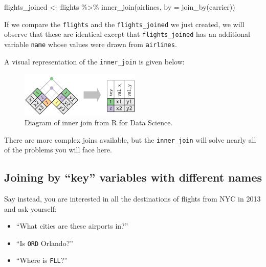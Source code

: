 \documentclass[
  letterpaper,
  DIV=11,
  numbers=noendperiod]{scrartcl}
\newenvironment{Shaded}{\begin{snugshade}}{\end{snugshade}}
\newcommand{\AttributeTok}[1]{\textcolor[rgb]{0.40,0.45,0.13}{#1}}
\newcommand{\FunctionTok}[1]{\textcolor[rgb]{0.28,0.35,0.67}{#1}}
\newcommand{\NormalTok}[1]{\textcolor[rgb]{0.00,0.23,0.31}{#1}}
\newcommand{\OtherTok}[1]{\textcolor[rgb]{0.00,0.23,0.31}{#1}}
\newcommand{\SpecialCharTok}[1]{\textcolor[rgb]{0.37,0.37,0.37}{#1}}
\providecommand{\tightlist}{%
  \setlength{\itemsep}{0pt}\setlength{\parskip}{0pt}}\usepackage{longtable,booktabs,array}
\begin{document}
\begin{Shaded}
\begin{Highlighting}[]
\NormalTok{flights\_joined }\OtherTok{\textless{}{-}}\NormalTok{ flights }\SpecialCharTok{\%\textgreater{}\%}
  \FunctionTok{inner\_join}\NormalTok{(airlines,}
             \AttributeTok{by =} \FunctionTok{join\_by}\NormalTok{(carrier))}
\end{Highlighting}
\end{Shaded}

If we compare the \texttt{flights} and the \texttt{flights\_joined} we
just created, we will observe that these are identical except that
\texttt{flights\_joined} has an additional variable \texttt{name} whose
values were drawn from \texttt{airlines}.

A visual representation of the \texttt{inner\_join} is given below:

\begin{figure}[H]

{\centering \includegraphics[width=2.25in,height=\textheight]{join-inner.png}

}

\caption{Diagram of inner join from R for Data Science.}

\end{figure}%

There are more complex joins available, but the \texttt{inner\_join}
will solve nearly all of the problems you will face here.

\subsection{Joining by ``key'' variables with different
names}\label{joining-by-key-variables-with-different-names}

Say instead, you are interested in all the destinations of flights from
NYC in 2013 and ask yourself:

\begin{itemize}
\tightlist
\item
  ``What cities are these airports in?''
\item
  ``Is \texttt{ORD} Orlando?''
\item
  ``Where is \texttt{FLL}?''
\end{itemize}
\end{document}
